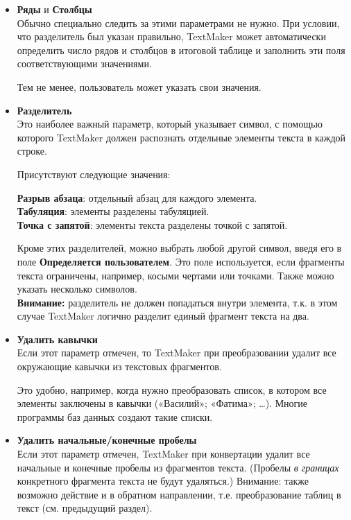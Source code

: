 \documentclass[a4paper,10pt]{article}
\begin{document}
\begin{itemize}
 \item \textbf{Ряды} и \textbf{Столбцы}\\
Обычно специально следить за этими параметрами не нужно. При условии, что разделитель был указан правильно, TextMaker может автоматически определить число рядов и столбцов в итоговой таблице и заполнить эти поля соответствующими значениями.

Тем не менее, пользователь может указать свои значения.
\item \textbf{Разделитель}\\
Это наиболее важный параметр, который указывает символ, с помощью которого TextMaker должен распознать отдельные элементы текста в каждой строке.

Присутствуют следующие значения:

\textbf{Разрыв абзаца}: отдельный абзац для каждого элемента.\\
\textbf{Табуляция}: элементы разделены табуляцией.\\
\textbf{Точка с запятой}: элементы текста разделены точкой с запятой.

Кроме этих разделителей, можно выбрать любой другой символ, введя его в поле \textbf{Определяется пользователем}. Это поле используется, если фрагменты текста ограничены, например, косыми чертами или точками. Также можно указать несколько символов.\\
\textbf{Внимание:} разделитель не должен попадаться внутри элемента, т.к. в этом случае TextMaker логично разделит единый фрагмент текста на два.
\item \textbf{Удалить кавычки}\\
Если этот параметр отмечен, то TextMaker при преобразовании удалит все окружающие кавычки из текстовых фрагментов.

Это удобно, например, когда нужно преобразовать список, в котором все элементы заключены в кавычки («Василий»; «Фатима»; …). Многие программы баз данных создают такие списки.
\item \textbf{Удалить начальные/конечные пробелы}\\
Если этот параметр отмечен, TextMaker при конвертации удалит все начальные и конечные пробелы из фрагментов текста. (Пробелы \textit{в границах} конкретного фрагмента текста не будут удаляться.)
Внимание: также возможно действие и в обратном направлении, т.е. преобразование таблиц в текст (см. предыдущий раздел).
\end{itemize}
\end{document}
